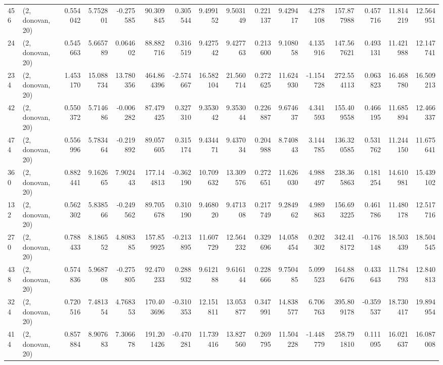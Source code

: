 \begin{tabular}{llrrrrrrrrrrrrrr}
456 &  (2, donovan, 20) &   0.554042 &   5.752801 &  -0.275585 &    90.309845 &   0.305544 &   9.499152 &   9.503149 &  0.221137 &   9.429417 &   4.278108 &   157.877988 &   0.457716 &  11.814219 &  12.564951 \\
24  &  (2, donovan, 20) &   0.545663 &   5.665789 &   0.064602 &    88.882716 &   0.316519 &   9.427542 &   9.427763 &  0.213600 &   9.108058 &   4.135916 &   147.567621 &   0.493131 &  11.421988 &  12.147741 \\
234 &  (2, donovan, 20) &   1.453170 &  15.088734 &  13.780356 &   464.864396 &  -2.574667 &  16.582104 &  21.560714 &  0.272625 &  11.624930 &  -1.154728 &   272.554113 &   0.063823 &  16.468780 &  16.509213 \\
42  &  (2, donovan, 20) &   0.550372 &   5.714686 &  -0.006282 &    87.479425 &   0.327310 &   9.353042 &   9.353044 &  0.226887 &   9.674637 &   4.341593 &   155.409558 &   0.466195 &  11.685894 &  12.466337 \\
474 &  (2, donovan, 20) &   0.556996 &   5.783464 &  -0.219892 &    89.057605 &   0.315174 &   9.434471 &   9.437034 &  0.204988 &   8.740843 &   3.144785 &   136.320585 &   0.531762 &  11.244150 &  11.675641 \\
360 &  (2, donovan, 20) &   0.882441 &   9.162665 &   7.902443 &   177.144813 &  -0.362190 &  10.709632 &  13.309576 &  0.272651 &  11.626030 &   4.988497 &   238.365863 &   0.181254 &  14.610981 &  15.439102 \\
132 &  (2, donovan, 20) &   0.562302 &   5.838566 &  -0.249562 &    89.705678 &   0.310190 &   9.468020 &   9.471308 &  0.217749 &   9.284962 &   4.989863 &   156.693225 &   0.461786 &  11.480178 &  12.517716 \\
270 &  (2, donovan, 20) &   0.788433 &   8.186552 &   4.808385 &   157.859925 &  -0.213895 &  11.607729 &  12.564232 &  0.329696 &  14.058454 &   0.202302 &   342.418172 &  -0.176148 &  18.503439 &  18.504545 \\
438 &  (2, donovan, 20) &   0.574836 &   5.968708 &  -0.275805 &    92.470233 &   0.288932 &   9.612188 &   9.616144 &  0.228666 &   9.750485 &   5.099523 &   164.886476 &   0.433643 &  11.784793 &  12.840813 \\
324 &  (2, donovan, 20) &   0.720516 &   7.481354 &   4.768353 &   170.403696 &  -0.310353 &  12.151811 &  13.053877 &  0.347991 &  14.838577 &   6.706763 &   395.809178 &  -0.359537 &  18.730417 &  19.894954 \\
414 &  (2, donovan, 20) &   0.857884 &   8.907683 &   7.306678 &   191.201426 &  -0.470281 &  11.739416 &  13.827560 &  0.269795 &  11.504228 &  -1.448779 &   258.791810 &   0.111095 &  16.021637 &  16.087008 \\

\end{tabular}
